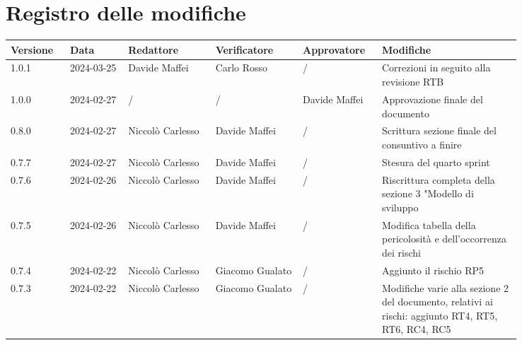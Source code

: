 \section*{Registro delle modifiche}
 {
  \renewcommand{\arraystretch}{1.5}
  \scriptsize
  \begin{longtable}{p{0.10\linewidth}p{0.10\linewidth}p{0.15\linewidth}p{0.15\linewidth}p{0.10\linewidth}p{0.24\linewidth}}
	  \textbf{Versione} & \textbf{Data} & \textbf{Redattore} & \textbf{Verificatore}  & \textbf{Approvatore} & \textbf{Modifiche}                                                \\
	  \toprule
	  1.0.1             & 2024-03-25    & Davide Maffei      & Carlo Rosso            & /                    & Correzioni in seguito alla revisione RTB                          \\
	  \hline
	  1.0.0             & 2024-02-27    & /                  & /                      & Davide Maffei        & Approvazione finale del documento                                 \\
	  \hline
	  0.8.0             & 2024-02-27    & Niccolò Carlesso   & Davide Maffei          & /                    & Scrittura sezione finale del consuntivo a finire                  \\
	  \hline
	  0.7.7             & 2024-02-27    & Niccolò Carlesso   & Davide Maffei          & /                    & Stesura del quarto sprint                                         \\
	  \hline
	  0.7.6             & 2024-02-26    & Niccolò Carlesso   & Davide Maffei          & /                    & Riscrittura completa della sezione 3 "Modello di sviluppo         \\
	  \hline
	  0.7.5             & 2024-02-26    & Niccolò Carlesso   & Davide Maffei          & /                    & Modifica tabella della pericolosità e dell’occorrenza dei rischi  \\
	  \hline
	  0.7.4             & 2024-02-22    & Niccolò Carlesso   & Giacomo Gualato        & /                    & Aggiunto il rischio RP5                                           \\
	  \hline
	  0.7.3             & 2024-02-22    & Niccolò Carlesso   & Giacomo Gualato        & /                    & Modifiche varie alla sezione 2 del documento, relativi ai rischi:
	  aggiunto RT4, RT5, RT6, RC4, RC5                                                                                                                                           \\

\end{longtable}}
